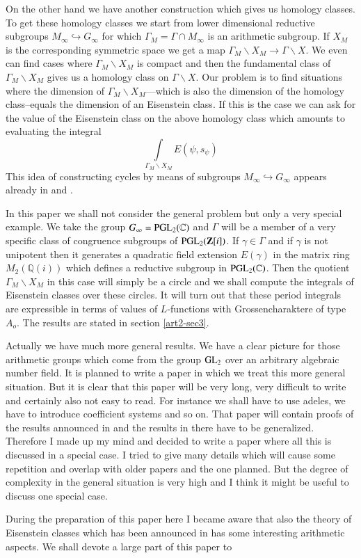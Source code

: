 On the other hand we have another construction which gives us homology classes. To get these homology classes we start from lower dimensional reductive subgroups $M_{\infty}\hookrightarrow G_{\infty}$ for which $\Gamma_{M}=\Gamma\cap M_{\infty}$ is an arithmetic subgroup. If $X_{M}$ is the corresponding symmetric space we get a map $\Gamma_{M}\backslash X_{M}\to \Gamma\backslash X$. We even can find cases where $\Gamma_{M}\backslash X_{M}$ is compact and then the fundamental class of $\Gamma_{M}\backslash X_{M}$ gives us a homology class on $\Gamma\backslash X$. Our problem is to find situations where the dimension of $\Gamma_{M}\backslash X_{M}$\pageoriginale---which is also the dimension of the homology class--equals the dimension of an Eisenstein class. If this is the case we can ask for the value of the Eisenstein class on the above homology class which amounts to evaluating the integral
$$
\int\limits_{\Gamma_{M}\backslash X_{M}}E(\psi,s_{\psi})
$$
This idea of constructing cycles by means of subgroups $M_{\infty}\hookrightarrow G_{\infty}$ appears already in \cite{art2-key2} and \cite{art2-key16}.

In this paper we shall not consider the general problem but only a very special example. We take the group $G_{\infty}=\mathrm{PGL}_{2}(\mathbb{C})$ and $\Gamma$ will be a member of a very specific class of congruence subgroups of $\mathrm{PGL}_{2}(\mathbf{Z}[i])$. If $\gamma\in \Gamma$ and if $\gamma$ is not unipotent then it generates a quadratic field extension $E(\gamma)$ in the matrix ring $M_{2}(\mathbb{Q}(i))$ which defines a reductive subgroup in $\mathrm{PGL}_{2}(\mathbb{C})$. Then the quotient $\Gamma_{M}\backslash X_{M}$ in this case will simply be a circle and we shall compute the integrals of Eisenstein classes over these circles. It will turn out that these period integrals are expressible in terms of values of $L$-functions with Grossencharaktere of type $A_{o}$. The results are stated in section \ref{art2-sec3}.

Actually we have much more general results. We have a clear picture for those arithmetic groups which come from the group $\mathrm{GL}_{2}$ over an arbitrary algebraic number field. It is planned to write a paper in which we treat this more general situation. But it is clear that this paper will be very long, very difficult to write and certainly also not easy to read. For instance we shall have to use adeles, we have to introduce coefficient systems and so on. That paper will contain proofs of the results announced in \cite{art2-key7} and the results in there have to be generalized. Therefore I made up my mind and decided to write a paper where all this is discussed in a special case. I tried to give many details which will cause some repetition and overlap with older papers and the one planned. But the degree of complexity in the general situation is very high and I think it might be useful to discuss one special case.

During the preparation of this paper here I became aware that also the theory of Eisenstein classes which has been announced in \cite{art2-key7} has some interesting arithmetic aspects. We shall devote a large part of this paper to\pageoriginale
